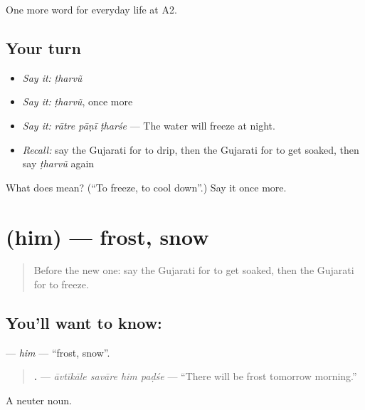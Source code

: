 \begin{grammarlens}[title={What you've built}]
One more word for everyday life at A2.
\end{grammarlens}

\subsection*{Your turn}
\begin{itemize}
\raggedright
  \item \emph{Say it:} \emph{ṭharvũ}
  \item \emph{Say it:} \emph{ṭharvũ}, once more
  \item \emph{Say it:} \emph{rātre pāṇī ṭharśe} — The water will freeze at night.
  \item \emph{Recall:} say the Gujarati for to drip, then the Gujarati for to get soaked, then say \emph{ṭharvũ} again
\end{itemize}

\begin{tcolorbox}[breakable,colback=teal!4,colframe=teal!35!black,title={Before you move on}]
What does  mean? (\textquotedblleft{}To freeze, to cool down\textquotedblright{}.) Say it once more.
\end{tcolorbox}
\section[\texorpdfstring{\gu{હિમ} (him)}{હિમ (him)}]{ (him) — frost, snow}

\label{lesson:GU-C215-him}



\begin{quote}
Before the new one: say the Gujarati for to get soaked, then the Gujarati for to freeze.
\end{quote}

\subsection*{You'll want to know: }
\textbf{} — \emph{him} — \textquotedblleft{}frost, snow\textquotedblright{}.

\begin{quote}
\textbf{   .} — \emph{āvtīkāle savāre him paḍśe} — \textquotedblleft{}There will be frost tomorrow morning.\textquotedblright{}
\end{quote}

A neuter noun.


